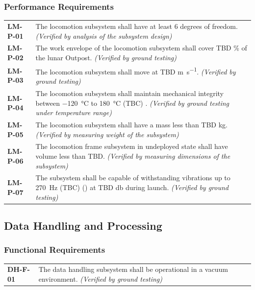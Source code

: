\documentclass[12pt, letterpaper]{article}
\begin{document}
\subsubsection*{Performance Requirements}
\vspace{-20pt}
\begin{longtable}{P{2cm}P{13.75cm}}
\textbf{LM-P-01}	&
The locomotion subsystem shall have at least 6 degrees of freedom.
\textit{(Verified by analysis of the subsystem design)}	\\
\textbf{LM-P-02}	&
The work envelope of the locomotion subsystem shall cover TBD \% of the lunar Outpost.
\textit{(Verified by ground testing)}	\\
\textbf{LM-P-03}	&
The locomotion subsystem shall move at TBD \si{\metre\per\second}.
\textit{(Verified by ground testing)}	\\
\textbf{LM-P-04}	&
The locomotion subsystem shall maintain mechanical integrity between \SI{-120}{\degreeCelsius} to \SI{180}{\degreeCelsius} (TBC) \cite{ERA_joints}.
\textit{(Verified by ground testing under temperature range)}	\\
\textbf{LM-P-05}	&
The locomotion subsystem shall have a mass less than TBD \si{\kilo\gram}.
\textit{(Verified by measuring weight of the subsystem)}	\\
\textbf{LM-P-06}	&
The locomotion frame subsystem in undeployed state shall have volume less than TBD.
\textit{(Verified by measuring dimensions of the subsystem)}	\\
\textbf{LM-P-07}	&
The subsystem shall be capable of withstanding vibrations up to \SI{270}{\hertz} (TBC) () at TBD \si{\decibel} during launch.
\textit{(Verified by ground testing)}
\end{longtable}

\subsection{Data Handling and Processing}
\label{sect:data}
\subsubsection*{Functional Requirements}
\vspace{-20pt}
\begin{longtable}{P{2cm}P{13.75cm}}
\textbf{DH-F-01}	&
The data handling subsystem shall be operational in a vacuum environment.
\textit{(Verified by ground testing)}
\end{longtable}
\end{document}
